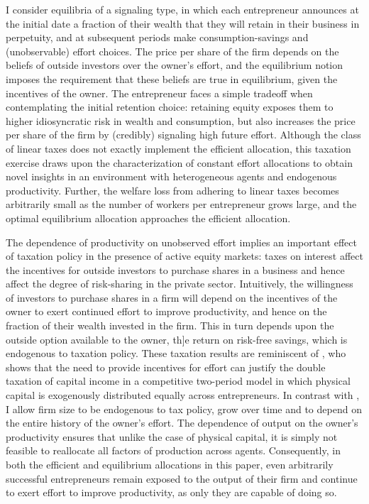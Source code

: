 \documentclass[11pt]{article}
\theoremstyle{plain}
\begin{document}
I consider equilibria of a signaling type, in which each entrepreneur announces at the initial date a fraction of their wealth that they will retain in their business in perpetuity, and at subsequent periods make consumption-savings and (unobservable) effort choices. The price per share of the firm depends on the beliefs of outside investors over the owner's effort, and the equilibrium notion imposes the requirement that these beliefs are true in equilibrium, given the incentives of the owner. The entrepreneur faces a simple tradeoff when contemplating the initial retention choice: retaining equity exposes them to higher idiosyncratic risk in wealth and consumption, but also increases the price per share of the firm by (credibly) signaling high future effort. Although the class of linear taxes does not exactly implement the efficient allocation, this taxation exercise draws upon the characterization of constant effort allocations to obtain novel insights in an environment with heterogeneous agents and endogenous productivity. Further, the welfare loss from adhering to linear taxes becomes arbitrarily small as the number of workers per entrepreneur grows large, and the optimal equilibrium allocation approaches the efficient allocation. 


The dependence of productivity on unobserved effort implies an important effect of taxation policy in the presence of active equity markets: taxes on interest affect the incentives for outside investors to purchase shares in a business and hence affect the degree of risk-sharing in the private sector. Intuitively, the willingness of investors to purchase shares in a firm will depend on the incentives of the owner to exert continued effort to improve productivity, and hence on the fraction of their wealth invested in the firm. This in turn depends upon the outside option available to the owner, th]e return on risk-free savings, which is endogenous to taxation policy. These taxation results are reminiscent of \cite{albanesi_optimal_2006}, who shows that the need to provide incentives for effort can justify the double taxation of capital income in a competitive two-period model in which physical capital is exogenously distributed equally across entrepreneurs. In contrast with \cite{albanesi_optimal_2006}, I allow firm size to be endogenous to tax policy, grow over time and to depend on the entire history of the owner's effort. The dependence of output on the owner's productivity ensures that unlike the case of physical capital, it is simply not feasible to reallocate all factors of production across agents. Consequently, in both the efficient and equilibrium allocations in this paper, even arbitrarily successful entrepreneurs remain exposed to the output of their firm and continue to exert effort to improve productivity, as only they are capable of doing so. 
\end{document}
